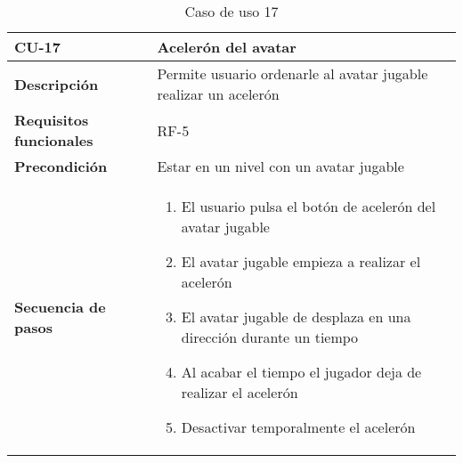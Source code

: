 \begin{longtable}{l|l}
\caption{Caso de uso 17}\\
\begin{minipage}{0.25\columnwidth}
\textbf{CU-17} 
\end{minipage}
&
\begin{minipage}{0.65\columnwidth}
Acelerón del avatar
\end{minipage}
\\ \hline

\begin{minipage}{0.25\columnwidth}
\textbf{Descripción} 
\end{minipage}
&
\begin{minipage}{0.65\columnwidth}
Permite usuario ordenarle al avatar jugable realizar un acelerón
\end{minipage}
\\ \hline

\begin{minipage}{0.25\columnwidth}
\textbf{Requisitos funcionales} 
\end{minipage}
&
\begin{minipage}{0.65\columnwidth}
RF-5
\end{minipage}
\\ \hline

\begin{minipage}{0.25\columnwidth}
\textbf{Precondición} 
\end{minipage}
&
\begin{minipage}{0.65\columnwidth}
Estar en un nivel con un avatar jugable
\end{minipage}
\\ \hline

\begin{minipage}{0.25\columnwidth}
\textbf{Secuencia de pasos} 
\end{minipage}
&
\begin{minipage}{0.65\columnwidth}
\begin{enumerate}
\item
El usuario pulsa el botón de acelerón del avatar jugable
\item
El avatar jugable empieza a realizar el acelerón
\item
El avatar jugable de desplaza en una dirección durante un tiempo
\item
Al acabar el tiempo el jugador deja de realizar el acelerón
\item
Desactivar temporalmente el acelerón
\end{enumerate}
\end{minipage}
\\ \hline


\end{longtable}
